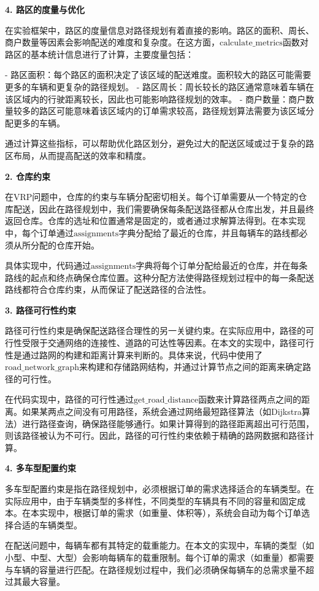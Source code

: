 \documentclass[12pt,a4paper,twoside]{ctexbook}
\begin{document}
\textbf{4. 路区的度量与优化}

在实验框架中，路区的度量信息对路径规划有着直接的影响。路区的面积、周长、商户数量等因素会影响配送的难度和复杂度。在这方面，$ \text{calculate\_metrics} $函数对路区的基本统计信息进行了计算，主要度量包括：

- 路区面积：每个路区的面积决定了该区域的配送难度。面积较大的路区可能需要更多的车辆和更复杂的路径规划。
- 路区周长：周长较长的路区通常意味着车辆在该区域内的行驶距离较长，因此也可能影响路径规划的效率。
- 商户数量：商户数量较多的路区可能意味着该区域内的订单需求较高，路径规划算法需要为该区域分配更多的车辆。

通过计算这些指标，可以帮助优化路区划分，避免过大的配送区域或过于复杂的路区布局，从而提高配送的效率和精度。

\textbf{2. 仓库约束}

在VRP问题中，仓库的约束与车辆分配密切相关。每个订单需要从一个特定的仓库配送，因此在路径规划中，我们需要确保每条配送路径都从仓库出发，并且最终返回仓库。仓库的选址和位置通常是固定的，或者通过求解算法得到。在本实现中，每个订单通过$ \text{assignments} $字典分配给了最近的仓库，并且每辆车的路线都必须从所分配的仓库开始。

具体实现中，代码通过$ \text{assignments} $字典将每个订单分配给最近的仓库，并在每条路线的起点和终点确保仓库位置。这种分配方法使得路径规划过程中的每一条配送路线都符合仓库约束，从而保证了配送路径的合法性。

\textbf{3. 路径可行性约束}

路径可行性约束是确保配送路径合理性的另一关键约束。在实际应用中，路径的可行性受限于交通网络的连接性、道路的可达性等因素。在本文的实现中，路径可行性是通过路网的构建和距离计算来判断的。具体来说，代码中使用了$ \text{road\_network\_graph} $来构建和存储路网结构，并通过计算节点之间的距离来确定路径的可行性。

在代码实现中，路径的可行性通过$ \text{get\_road\_distance} $函数来计算路径两点之间的距离。如果某两点之间没有可用路径，系统会通过网络最短路径算法（如Dijkstra算法）进行路径查询，确保路径能够通行。如果计算得到的路径距离超出可行范围，则该路径被认为不可行。因此，路径的可行性约束依赖于精确的路网数据和路径计算。

\textbf{4. 多车型配置约束}

多车型配置约束是指在路径规划中，必须根据订单的需求选择适合的车辆类型。在实际应用中，由于车辆类型的多样性，不同类型的车辆具有不同的容量和固定成本。在本实现中，根据订单的需求（如重量、体积等），系统会自动为每个订单选择合适的车辆类型。

在配送问题中，每辆车都有其特定的载重能力。在本文的实现中，车辆的类型（如小型、中型、大型）会影响每辆车的载重限制。每个订单的需求（如重量）都需要与车辆的容量进行匹配。在路径规划过程中，我们必须确保每辆车的总需求量不超过其最大容量。
\end{document}
